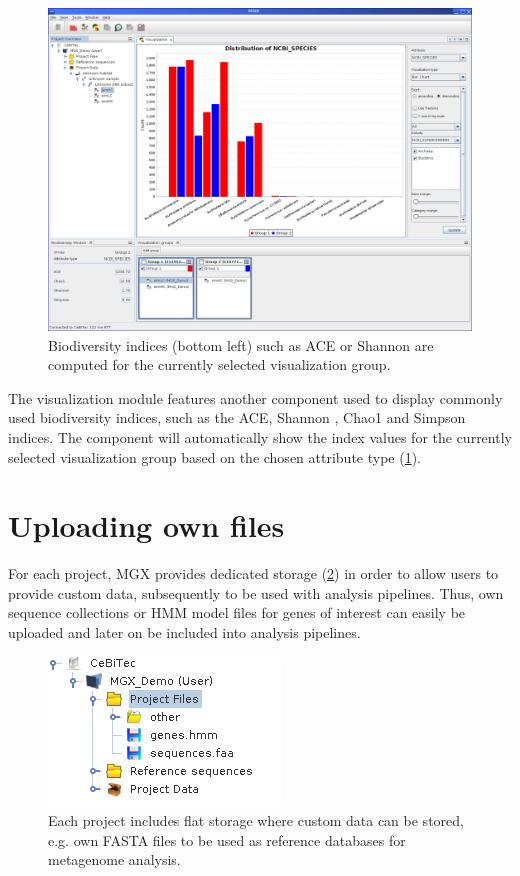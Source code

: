\begin{figure}[H]
\centering
\includegraphics[width=\textwidth]{img/mgx/BioDiversity}
\caption[Biodiversity]{Biodiversity indices (bottom left) such as ACE or Shannon are computed for the currently
selected visualization group.}
\label{biodiv}
\end{figure}

The visualization module features another component used to display commonly used biodiversity indices, such as
the ACE, Shannon \cite{SHANNON}, Chao1 \cite{DIVERSITY} and Simpson \cite{SIMPSON} indices. The component will automatically show the index values for the
currently selected visualization group based on the chosen attribute type (\ref{biodiv}).


\section{Uploading own files}

For each project, MGX provides dedicated storage (\ref{serverfs}) in order to allow users to
provide custom data, subsequently to be used with analysis pipelines. Thus,
own sequence collections or HMM model files for genes of interest can easily
be uploaded and later on be included into analysis pipelines.\\

\begin{figure}[H]
\centering
\includegraphics[width=.45\textwidth]{img/mgx/serverfs}
\caption[File storage]{Each project includes flat storage where custom
data can be stored, e.g. own FASTA files to be used as reference databases
for metagenome analysis.}
\label{serverfs}
\end{figure}

